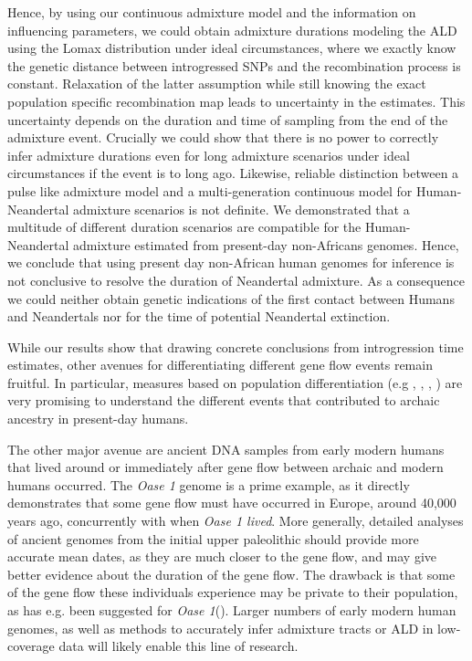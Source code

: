 \documentclass[]{article}
\begin{document}
Hence, by using our continuous admixture model and the information on influencing parameters, we could obtain admixture durations modeling the ALD using the Lomax distribution under ideal circumstances, where we exactly know the genetic distance between introgressed SNPs and the recombination process is constant. Relaxation of the latter assumption while still knowing the exact population specific recombination map  leads to  uncertainty in the estimates. This uncertainty depends on the duration and time of sampling from the end of the admixture event. Crucially we could show that there is no power to correctly infer admixture durations even for long admixture scenarios under ideal circumstances if the event is to long ago. Likewise, reliable distinction between a pulse like admixture model and a multi-generation continuous model for Human-Neandertal admixture scenarios is not definite. We demonstrated that a multitude of different duration scenarios are compatible for the Human-Neandertal admixture estimated from  present-day non-Africans genomes. Hence, we conclude that using present day non-African human genomes for inference is not conclusive to resolve the duration of Neandertal admixture. As a consequence we could neither obtain genetic indications of the first contact between Humans and Neandertals nor for the time of potential Neandertal extinction.

While our results show that drawing concrete conclusions from introgression time estimates, other avenues for differentiating different gene flow events remain fruitful.
In particular, measures based on population differentiation (e.g \cite{browning_analysis_2018}, \cite{wall2013_genetics}, \cite{villanea_schraiber 2018_nature_ee}, \cite{jacobs_multiple_2019}) are very promising to understand the different events that contributed to archaic ancestry in present-day humans. 

The other major avenue are ancient DNA samples from early modern humans that lived around or immediately after gene flow between archaic and modern humans occurred. The \textit{Oase 1} genome is a prime example, as it directly demonstrates that some gene flow must have occurred in Europe, around 40,000 years ago, concurrently with when \textit{Oase 1 lived}. More generally, detailed analyses of ancient genomes from the initial upper paleolithic should provide more accurate mean dates, as they are much closer to the gene flow, and may give better evidence about the duration of the gene flow. The drawback is that some of the gene flow these individuals experience may be private to their population, as has e.g. been suggested for \textit{Oase 1}(\cite{fu_genome_2014}). Larger numbers of early modern human genomes, as well as methods to accurately infer admixture tracts or ALD in low-coverage data will likely enable this line of research. 
\end{document}
